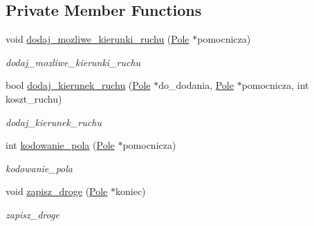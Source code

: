 \subsection*{Private Member Functions}
\begin{DoxyCompactItemize}
\item 
void \hyperlink{class_plansza_a56a28ea3686cecf09e45656bbb4300b5}{dodaj\+\_\+mozliwe\+\_\+kierunki\+\_\+ruchu} (\hyperlink{class_pole}{Pole} $\ast$pomocnicza)
\begin{DoxyCompactList}\small\item\em dodaj\+\_\+mozliwe\+\_\+kierunki\+\_\+ruchu \end{DoxyCompactList}\item 
bool \hyperlink{class_plansza_acabb8d0b2442fa98eb55ffe86ecf5700}{dodaj\+\_\+kierunek\+\_\+ruchu} (\hyperlink{class_pole}{Pole} $\ast$do\+\_\+dodania, \hyperlink{class_pole}{Pole} $\ast$pomocnicza, int koszt\+\_\+ruchu)
\begin{DoxyCompactList}\small\item\em dodaj\+\_\+kierunek\+\_\+ruchu \end{DoxyCompactList}\item 
int \hyperlink{class_plansza_a82f97be142851d458bb04b0dc6c1def4}{kodowanie\+\_\+pola} (\hyperlink{class_pole}{Pole} $\ast$pomocnicza)
\begin{DoxyCompactList}\small\item\em kodowanie\+\_\+pola \end{DoxyCompactList}\item 
void \hyperlink{class_plansza_a77ca237c0aa83871106611d4411e4aa8}{zapisz\+\_\+droge} (\hyperlink{class_pole}{Pole} $\ast$koniec)
\begin{DoxyCompactList}\small\item\em zapisz\+\_\+droge \end{DoxyCompactList}\end{DoxyCompactItemize}
